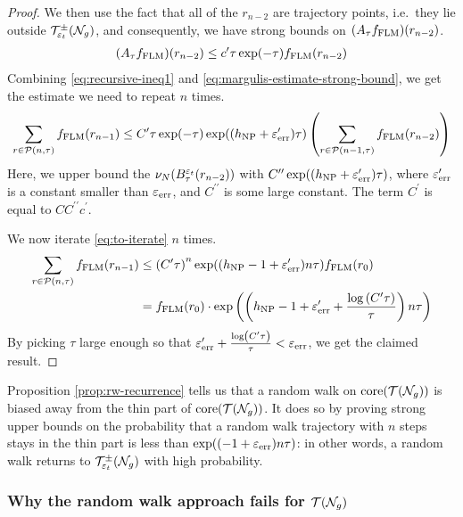 \begin{proof}
  We then use the fact that all of the $r_{n-2}$ are \concave trajectory points, i.e.\ they lie outside $\mathcal{T}_{\varepsilon_t}^{\pm}(\mathcal{N}_g)$, and consequently, we have strong bounds on $(A_{\tau} f_{\mathrm{FLM}})(r_{n-2})$.
  \begin{align}
    \label{eq:margulis-estimate-strong-bound}
    (A_{\tau}f_{\mathrm{FLM}})(r_{n-2}) \leq c^{\prime} \tau \exp(-\tau) f_{\mathrm{FLM}}(r_{n-2})
  \end{align}
  Combining \eqref{eq:recursive-ineq1} and \eqref{eq:margulis-estimate-strong-bound}, we get the estimate we need to repeat $n$ times.
  \begin{align}
    \label{eq:to-iterate}
    \sum_{r \in \mathcal{P}(n, \tau)} f_{\mathrm{FLM}}(r_{n-1}) \leq C^{\prime} \tau \exp(-\tau) \exp((h_{\mathrm{NP}} + \varepsilon_{\mathrm{err}}^{\prime})\tau) \left( \sum_{r \in \mathcal{P}(n-1, \tau)} f_{\mathrm{FLM}}(r_{n-2}) \right)
  \end{align}
  Here, we upper bound the $\nu_N(B_{\tau}^{\varepsilon_t}(r_{n-2}))$ with $C^{\prime \prime} \exp((h_{\mathrm{NP}} + \varepsilon_{\mathrm{err}}^{\prime})\tau)$, where $\varepsilon_{\mathrm{err}}^{\prime}$ is a constant smaller than $\varepsilon_{\mathrm{err}}$, and $C^{\prime \prime}$ is some large constant.
  The term $C^{\prime}$ is equal to $C C^{\prime \prime} c^{\prime}$.

  We now iterate \eqref{eq:to-iterate} $n$ times.
  \begin{align*}
    \sum_{r \in \mathcal{P}(n, \tau)} f_{\mathrm{FLM}}(r_{n-1}) &\leq \left( C^{\prime} \tau \right)^n \exp((h_{\mathrm{NP}} - 1 + \varepsilon_{\mathrm{err}}^{\prime})n\tau) f_{\mathrm{FLM}}(r_0) \\
                                              &= f_{\mathrm{FLM}}(r_0) \cdot \exp\left( \left( h_{\mathrm{NP}} - 1 + \varepsilon_{\mathrm{err}}^{\prime} + \frac{\log\left( C^{\prime} \tau \right)}{\tau} \right) n\tau \right)
  \end{align*}
  By picking $\tau$ large enough so that $\varepsilon_{\mathrm{err}}^{\prime} + \frac{\log\left( C^{\prime} \tau \right)}{\tau} < \varepsilon_{\mathrm{err}}$, we get the claimed result.
\end{proof}

Proposition \ref{prop:rw-recurrence} tells us that a random walk on $\mathrm{core}(\mathcal{T}(\mathcal{N}_g))$ is biased away from the thin part of $\mathrm{core}(\mathcal{T}(\mathcal{N}_g))$.
It does so by proving strong upper bounds on the probability that a random walk trajectory with $n$ steps stays in the thin part is less than $\exp((-1 + \varepsilon_{\mathrm{err}})n\tau)$: in other words, a random walk returns to $\mathcal{T}_{\varepsilon_t}^{\pm}(\mathcal{N}_g)$ with high probability.

\subsubsection{Why the random walk approach fails for $\mathcal{T}(\mathcal{N}_g)$}
\label{sec:why-approach-fails}

